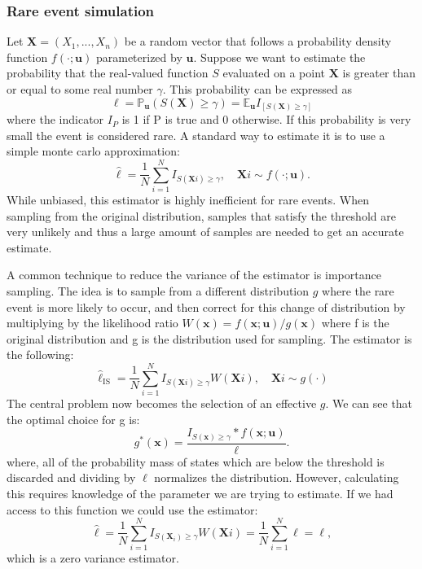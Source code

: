 \documentclass{article}
\begin{document}
\subsubsection{Rare event simulation}
Let $\mathbf{X} = (X_1,...,X_n)$ be a random vector that follows a probability density function $f(\cdot;\mathbf{u})$ parameterized by $\mathbf{u}$. Suppose we want to estimate the probability that the real-valued function $S$ evaluated on a point $\mathbf{X}$ is greater than or equal to some real number $\gamma$. This probability can be expressed as
\begin{equation}
\ell = \mathbb{P}_{\mathbf{u}}(S(\mathbf{X}) \geq \gamma) = \mathbb{E}_{\mathbf{u}}I_{[{S(\mathbf{X}) \geq \gamma}]}
\end{equation}
where the indicator $I_P$ is 1 if P is true and 0 otherwise.
If this probability is very small the event is considered rare.
A standard way to estimate it is to use a simple monte carlo approximation:
\begin{equation}
\hat{\ell} = \frac{1}{N} \sum_{i=1}^{N} I_{{S(\mathbf{X}i) \geq \gamma}}, \quad \mathbf{X}i \sim f(\cdot;\mathbf{u}).
\end{equation}
While unbiased, this estimator is highly inefficient for rare events. When sampling from the original distribution, samples that satisfy the threshold are very unlikely and thus a large amount of samples are needed to get an accurate estimate.

A common technique to reduce the variance of the estimator is importance sampling. The idea is to sample from a different distribution $g$ where the rare event is more likely to occur, and then correct for this change of distribution by multiplying by the likelihood ratio $W(\mathbf{x}) = f(\mathbf{x};\mathbf{u})/g(\mathbf{x})$ where f is the original distribution and g is the distribution used for sampling. The estimator is the following:
\begin{equation}
\hat{\ell}_{\text{IS}} = \frac{1}{N} \sum_{i=1}^{N} I_{{S(\mathbf{X}i) \geq \gamma}} W(\mathbf{X}i), \quad \mathbf{X}i \sim g(\cdot)
\end{equation}
The central problem now becomes the selection of an effective $g$. We can see that the optimal choice for g is:
\begin{equation}
g^*(\mathbf{x}) = \frac{I_{{S(\mathbf{x}) \geq \gamma}} *f(\mathbf{x};\mathbf{u})}{\ell}.
\end{equation} 
where, all of the probability mass of states which are below the threshold is discarded and dividing by $\ell$ normalizes the distribution.
However, calculating this requires knowledge of the parameter we are trying to estimate. If we had access to this function we could use the estimator:
\begin{equation}
\hat{\ell} = \frac{1}{N} \sum_{i=1}^{N} I_{{S(\mathbf{X}_i) \geq \gamma}} W(\mathbf{X}i) = \frac{1}{N} \sum_{i=1}^{N} \ell = \ell,
\end{equation}
which is a zero variance estimator.
\end{document}
